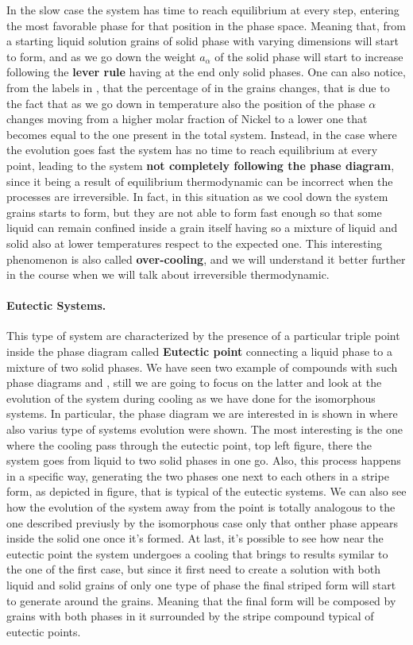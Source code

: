 In the slow case the system has time to reach equilibrium at every step, entering the most favorable phase for that position in the phase space. Meaning that, from a starting liquid solution grains of solid phase with varying dimensions will start to form, and as we go down the weight $a_\alpha$ of the solid phase will start to increase following the \textbf{lever rule} having at the end only solid phases. One can also notice, from the labels in , that the percentage of  in the grains changes, that is due to the fact that as we go down in temperature also the position of the phase $\alpha$ changes moving from a higher molar fraction of Nickel to a lower one that becomes equal to the one present in the total system. Instead, in the case where the evolution goes fast the system has no time to reach equilibrium at every point, leading to the system \textbf{not completely following the phase diagram}, since it being a result of equilibrium thermodynamic can be incorrect when the processes are irreversible. In fact, in this situation as we cool down the system grains starts to form, but they are not able to form fast enough so that some liquid can remain confined inside a grain itself having so a mixture of liquid and solid also at lower temperatures respect to the expected one. This interesting phenomenon is also called \textbf{over-cooling}, and we will understand it better further in the course when we will talk about irreversible thermodynamic.

\paragraph{Eutectic Systems.} This type of system are characterized by the presence of a particular triple point inside the phase diagram called \textbf{Eutectic point} connecting a liquid phase to a mixture of two solid phases. We have seen two example of compounds with such phase diagrams  and , still we are going to focus on the latter and look at the evolution of the system during cooling as we have done for the isomorphous systems. In particular, the phase diagram we are interested in is shown in  where also varius type of systems evolution were shown. The most interesting is the one where the cooling pass through the eutectic point, top left figure, there the system goes from liquid to two solid phases in one go. Also, this process happens in a specific way, generating the two phases one next to each others in a stripe form, as depicted in figure, that is typical of the eutectic systems. We can also see how the evolution of the system away from the point is totally analogous to the one described previusly by the isomorphous case only that onther phase appears inside the solid one once it's formed. At last, it's possible to see how near the eutectic point the system undergoes a cooling that brings to results symilar to the one of the first case, but since it first need to create a solution with both liquid and solid grains of only one type of phase the final striped form will start to generate around the grains. Meaning that the final form will be composed by grains with both phases in it surrounded by the stripe compound typical of eutectic points.

